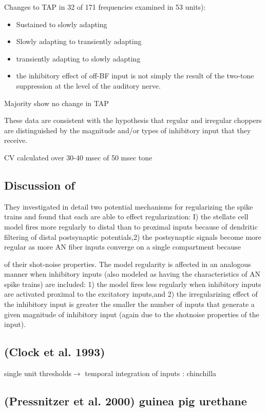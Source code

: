\documentclass[10pt,a4paper]{article}
\begin{document}
Changes to TAP in 32 of 171 frequencies examined in 53 units):


\begin{itemize}
\item Sustained to slowly adapting
\item Slowly adapting to transiently adapting
\item transiently adapting to slowly adapting
\item the inhibitory effect of off-BF input is not simply the result of the
  two-tone suppression at the level of the auditory nerve.
\end{itemize}
Majority show no change in TAP

These data are consistent with the hypothesis that regular and irregular
choppers are distinguished by the magnitude and/or types of inhibitory input
that they receive.

CV calculated over 30-40 msec of 50 msec tone

\subsection{Discussion of \citep{BanksSachs:1991}}
 They investigated in detail two potential
mechanisms for regularizing the spike trains and found that each are able to
effect regularization: I) the stellate cell model fires more regularly to distal
than to proximal inputs because of dendritic filtering of distal postsynaptic
potentials,2) the postsynaptic signals become more regular as more AN fiber
inputs converge on a single compartment because

of their shot-noise properties. The model regularity is affected in an analogous
manner when inhibitory inputs (also modeled as having the characteristics of AN
spike trains) are included: 1) the model fires less regularly when inhibitory
inputs are activated proximal to the excitatory inputs,and 2) the irregularizing
effect of the inhibitory input is greater the smaller the number of inputs that
generate a given magnitude of inhibitory input (again due to the shotnoise
properties of the input).

\subsection{(Clock et al. 1993)}
single unit thresholds\ensuremath{\rightarrow} temporal
integration of inputs : chinchilla

\subsection{(Pressnitzer et al. 2000) guinea pig urethane}
\end{document}

